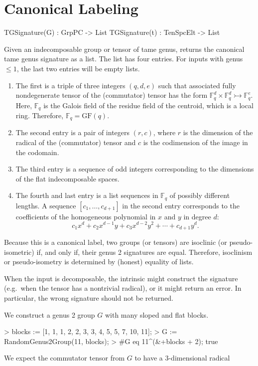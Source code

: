 \documentclass{documentation}
\begin{document}
\chapter{Canonical Labeling}

\begin{intrinsics}
TGSignature(G) : GrpPC -> List
TGSignature(t) : TenSpcElt -> List
\end{intrinsics}

Given an indecomposable group or tensor of tame genus, returns the canonical tame genus signature as a list. 
The list has four entries. For inputs with genus $\leq 1$, the last two entries will be empty lists. 
\begin{enumerate}
    \item The first is a triple of three integers $(q, d, e)$ such that associated fully nondegenerate tensor of the (commutator) tensor has the form $\mathbb{F}_q^d\times \mathbb{F}_q^d\rightarrowtail \mathbb{F}_q^e$. Here, $\mathbb{F}_q$ is the Galois field of the residue field of the centroid, which is a local ring. Therefore, $\mathbb{F}_q = \mathrm{GF}(q)$.
    \item The second entry is a pair of integers $(r, c)$, where $r$ is the dimension of the radical of the (commutator) tensor and $c$ is the codimension of the image in the codomain. 
    \item The third entry is a sequence of odd integers corresponding to the dimensions of the flat indecomposable spaces.
    \item The fourth and last entry is a list sequences in $\mathbb{F}_q$ of possibly different lengths. A sequence $[c_1,\dots, c_{d+1}]$ in the second entry corresponds to the coefficients of the homogeneous polynomial in $x$ and $y$ in degree $d$:
    \[ c_1x^d + c_2 x^{d-1}y + c_3 x^{d-2}y^2 + \cdots + c_{d+1}y^d. \]
\end{enumerate}
Because this is a canonical label, two groups (or tensors) are isoclinic (or pseudo-isometric) if, and only if, their genus 2 signatures are equal. Therefore, isoclinism or pseudo-isometry is determined by (honest) equality of lists. 

When the input is decomposable, the intrinsic might construct the signature (e.g.\ when the tensor has a nontrivial radical), or it might return an error. In particular, the wrong signature should not be returned. 

\begin{example}[ManyBlocks]
    We construct a genus 2 group $G$ with many sloped and flat blocks. 
\begin{code}
> blocks := [1, 1, 1, 2, 2, 3, 3, 4, 5, 5, 7, 10, 11];
> G := RandomGenus2Group(11, blocks);
> #G eq 11^(&+blocks + 2); 
true    
\end{code}

    We expect the commutator tensor from $G$ to have a $3$-dimensional radical 
\end{example}
\end{document}
